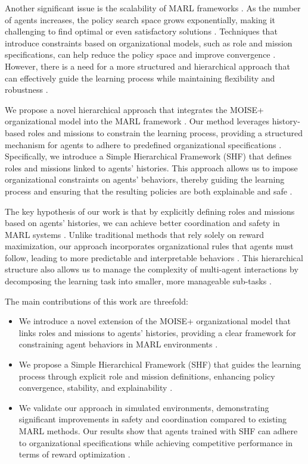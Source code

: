 \documentclass[sigconf,anonymous]{aamas}
\begin{document}
Another significant issue is the scalability of MARL frameworks \cite{chu2020multi}. As the number of agents increases, the policy search space grows exponentially, making it challenging to find optimal or even satisfactory solutions \cite{lowe2017multi}. Techniques that introduce constraints based on organizational models, such as role and mission specifications, can help reduce the policy space and improve convergence \cite{mataric1997using}. However, there is a need for a more structured and hierarchical approach that can effectively guide the learning process while maintaining flexibility and robustness \cite{yang2018mean}.


We propose a novel hierarchical approach that integrates the MOISE+ organizational model into the MARL framework \cite{hubner2007using}. Our method leverages history-based roles and missions to constrain the learning process, providing a structured mechanism for agents to adhere to predefined organizational specifications \cite{hubner2010moise}. Specifically, we introduce a Simple Hierarchical Framework (SHF) that defines roles and missions linked to agents' histories. This approach allows us to impose organizational constraints on agents' behaviors, thereby guiding the learning process and ensuring that the resulting policies are both explainable and safe \cite{bastani2018verifiable, castaneda2019policy}.

The key hypothesis of our work is that by explicitly defining roles and missions based on agents' histories, we can achieve better coordination and safety in MARL systems \cite{foerster2018counterfactual}. Unlike traditional methods that rely solely on reward maximization, our approach incorporates organizational rules that agents must follow, leading to more predictable and interpretable behaviors \cite{su2021toward}. This hierarchical structure also allows us to manage the complexity of multi-agent interactions by decomposing the learning task into smaller, more manageable sub-tasks \cite{yang2018mean}.

The main contributions of this work are threefold:
\begin{itemize}
    \item We introduce a novel extension of the MOISE+ organizational model that links roles and missions to agents' histories, providing a clear framework for constraining agent behaviors in MARL environments \cite{hubner2010moise}.
    \item We propose a Simple Hierarchical Framework (SHF) that guides the learning process through explicit role and mission definitions, enhancing policy convergence, stability, and explainability \cite{foerster2018counterfactual, yang2018mean}.
    \item We validate our approach in simulated environments, demonstrating significant improvements in safety and coordination compared to existing MARL methods. Our results show that agents trained with SHF can adhere to organizational specifications while achieving competitive performance in terms of reward optimization \cite{chu2020multi, wei2019safe}.
\end{itemize}
\end{document}
